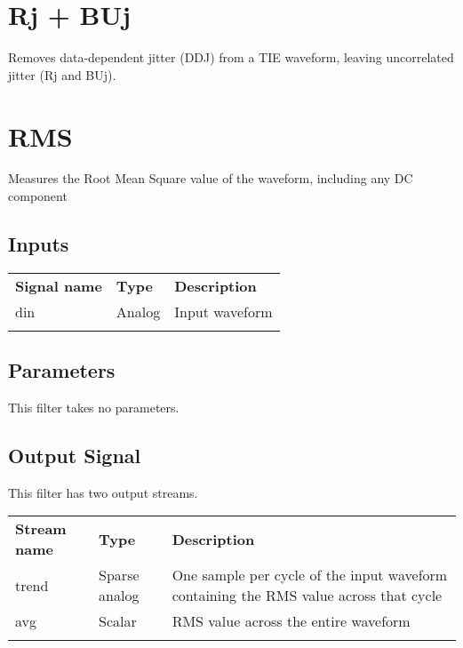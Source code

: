 \section{Rj + BUj}

Removes data-dependent jitter (DDJ) from a TIE waveform, leaving uncorrelated jitter (Rj and BUj).

\pagebreak
\section{RMS}
\label{filter:rms}

Measures the Root Mean Square value of the waveform, including any DC component


\subsection{Inputs}

\begin{tabularx}{16cm}{llX}
\thickhline
\textbf{Signal name} & \textbf{Type} & \textbf{Description} \\
\thickhline
din & Analog & Input waveform \\
\thickhline
\end{tabularx}

\subsection{Parameters}

This filter takes no parameters.

\subsection{Output Signal}

This filter has two output streams.

\begin{tabularx}{16cm}{llX}
\thickhline
\textbf{Stream name} & \textbf{Type} & \textbf{Description} \\
\thickhline
trend & Sparse analog & One sample per cycle of the input waveform containing the RMS value across that cycle \\
\thinhline
avg & Scalar & RMS value across the entire waveform \\
\thickhline
\end{tabularx}

